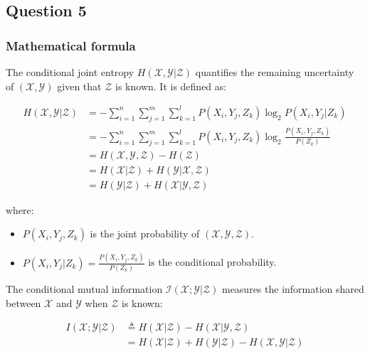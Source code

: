 \documentclass{article}
\begin{document}
\subsection*{Question 5}

\subsubsection*{Mathematical formula}

The conditional joint entropy $H(\mathcal{X}, \mathcal{Y} | \mathcal{Z})$ quantifies the remaining uncertainty of $(\mathcal{X},\mathcal{Y})$ given that $\mathcal{Z}$ is known. It is defined as:

\begin{align}
H(\mathcal{X}, \mathcal{Y} | \mathcal{Z}) &= - \sum_{i=1}^{n} \sum_{j=1}^{m} \sum_{k=1}^{l} P(X_i, Y_j, Z_k) \log_2 P(X_i, Y_j | Z_k) \\
&= - \sum_{i=1}^{n} \sum_{j=1}^{m} \sum_{k=1}^{l} P(X_i, Y_j, Z_k) \log_2 \frac{P(X_i, Y_j, Z_k)}{P(Z_k)} \\
&= H(\mathcal{X}, \mathcal{Y}, \mathcal{Z}) - H(\mathcal{Z}) \\
&= H(\mathcal{X} | \mathcal{Z}) + H(\mathcal{Y} | \mathcal{X}, \mathcal{Z}) \\
&= H(\mathcal{Y} | \mathcal{Z}) + H(\mathcal{X} | \mathcal{Y}, \mathcal{Z})
\end{align}

where:
\begin{itemize}
    \item $P(X_i, Y_j, Z_k)$ is the joint probability of $(\mathcal{X},\mathcal{Y},\mathcal{Z})$.
    \item $P(X_i, Y_j | Z_k) = \frac{P(X_i, Y_j, Z_k)}{P(Z_k)}$ is the conditional probability.
\end{itemize}

The conditional mutual information $\mathcal{I(\mathcal{X};\mathcal{Y} | \mathcal{Z})}$ measures the information shared between $\mathcal{X}$ and $\mathcal{Y}$ when $\mathcal{Z}$ is known:



\begin{align}
I(\mathcal{X};\mathcal{Y} | \mathcal{Z}) &\triangleq H(\mathcal{X} | \mathcal{Z}) - H(\mathcal{X} | \mathcal{Y}, \mathcal{Z}) \\
&= H(\mathcal{X} | \mathcal{Z}) + H(\mathcal{Y} | \mathcal{Z}) - H(\mathcal{X}, \mathcal{Y} | \mathcal{Z})
\end{align}
\end{document}
